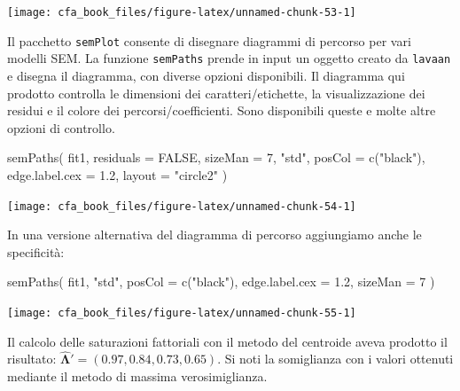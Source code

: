 \documentclass[
  11pt,
]{krantz}
\makeatletter
\newenvironment{Shaded}{\begin{snugshade}}{\end{snugshade}}
\newcommand{\AttributeTok}[1]{\textcolor[rgb]{0.61,0.61,0.61}{#1}}
\newcommand{\ConstantTok}[1]{\textcolor[rgb]{0,0,0}{#1}}
\newcommand{\DecValTok}[1]{\textcolor[rgb]{0.06,0.06,0.06}{#1}}
\newcommand{\FloatTok}[1]{\textcolor[rgb]{0.06,0.06,0.06}{#1}}
\newcommand{\FunctionTok}[1]{\textcolor[rgb]{0,0,0}{#1}}
\newcommand{\NormalTok}[1]{#1}
\newcommand{\StringTok}[1]{\textcolor[rgb]{0.5,0.5,0.5}{#1}}
\newenvironment{kframe}{%
\medskip{}
\setlength{\fboxsep}{.8em}
 \def\at@end@of@kframe{}%
 \ifinner\ifhmode%
  \def\at@end@of@kframe{\end{minipage}}%
  \begin{minipage}{\columnwidth}%
 \fi\fi%
 \def\FrameCommand##1{\hskip\@totalleftmargin \hskip-\fboxsep
 \colorbox{shadecolor}{##1}\hskip-\fboxsep
     \hskip-\linewidth \hskip-\@totalleftmargin \hskip\columnwidth}%
 \MakeFramed {\advance\hsize-\width
   \@totalleftmargin\z@ \linewidth\hsize
   \@setminipage}}%
 {\par\unskip\endMakeFramed%
 \at@end@of@kframe}
\renewenvironment{Shaded}{\begin{kframe}}{\end{kframe}}
\theoremstyle{definition}
\theoremstyle{definition}
\theoremstyle{definition}
\theoremstyle{definition}
\theoremstyle{remark}
\makeatother
\begin{document}
\begin{center}\texttt{[image: cfa\_book\_files/figure-latex/unnamed-chunk-53-1]} \end{center}

Il pacchetto \texttt{semPlot} consente di disegnare diagrammi di percorso per vari modelli SEM. La funzione \texttt{semPaths} prende in input un oggetto creato da \texttt{lavaan} e disegna il diagramma, con diverse opzioni disponibili. Il diagramma qui prodotto controlla le dimensioni dei caratteri/etichette, la visualizzazione dei residui e il colore dei percorsi/coefficienti. Sono disponibili queste e molte altre opzioni di controllo.

\begin{Shaded}
\begin{Highlighting}[]
\FunctionTok{semPaths}\NormalTok{(}
\NormalTok{  fit1,}
  \AttributeTok{residuals =} \ConstantTok{FALSE}\NormalTok{,}
  \AttributeTok{sizeMan =} \DecValTok{7}\NormalTok{,}
  \StringTok{"std"}\NormalTok{,}
  \AttributeTok{posCol =} \FunctionTok{c}\NormalTok{(}\StringTok{"black"}\NormalTok{),}
  \AttributeTok{edge.label.cex =} \FloatTok{1.2}\NormalTok{,}
  \AttributeTok{layout =} \StringTok{"circle2"}
\NormalTok{)}
\end{Highlighting}
\end{Shaded}

\begin{center}\texttt{[image: cfa\_book\_files/figure-latex/unnamed-chunk-54-1]} \end{center}

In una versione alternativa del diagramma di percorso aggiungiamo anche le specificità:

\begin{Shaded}
\begin{Highlighting}[]
\FunctionTok{semPaths}\NormalTok{(}
\NormalTok{  fit1,}
  \StringTok{"std"}\NormalTok{,}
  \AttributeTok{posCol =} \FunctionTok{c}\NormalTok{(}\StringTok{"black"}\NormalTok{),}
  \AttributeTok{edge.label.cex =} \FloatTok{1.2}\NormalTok{,}
  \AttributeTok{sizeMan =} \DecValTok{7}
\NormalTok{)}
\end{Highlighting}
\end{Shaded}

\begin{center}\texttt{[image: cfa\_book\_files/figure-latex/unnamed-chunk-55-1]} \end{center}

Il calcolo delle saturazioni fattoriali con il metodo del centroide aveva prodotto il risultato: \(\boldsymbol{\hat{\Lambda}}'= (0.97, 0.84, 0.73, 0.65)\). Si noti la somiglianza con i valori ottenuti mediante il metodo di massima verosimiglianza.
\end{document}
